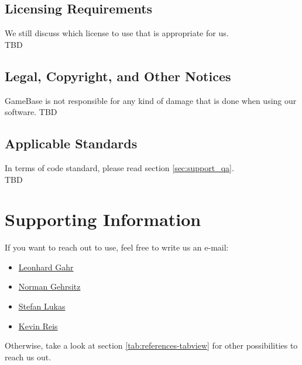 \documentclass[a4paper,12pt,chapterprefix=false,bibliography=totoc,listof=totoc,]{scrreprt}
\newcommand{\gls}[1]{\uppercase{#1}}
\begin{document}
\section{Licensing Requirements}
We still discuss which license to use that is appropriate for us.\\
\gls{tbd}

\section{Legal, Copyright, and Other Notices}
GameBase is not responsible for any kind of damage that is done when using our software. 
\gls{tbd}

\section{Applicable Standards}
In terms of code standard, please read section \ref{sec:support_qa}. \\

\gls{tbd}

\chapter{Supporting Information}
If you want to reach out to use, feel free to write us an e-mail:
\begin{itemize}
	\item \href{mailto:gahr.leonhard@student.dhbw-karlsruhe.de}{Leonhard Gahr}
	\item \href{mailto:gehrsitz.norman@student.dhbw-karlsruhe.de}{Norman Gehrsitz}
	\item \href{mailto:lukas.stefan@student.dhbw-karlsruhe.de}{Stefan Lukas}
	\item \href{mailto:reis.kevin@student.dhbw-karlsruhe.de}{Kevin Reis}
\end{itemize}

Otherwise, take a look at section \ref{tab:references-tabview} for other possibilities to reach us out.
\end{document}
